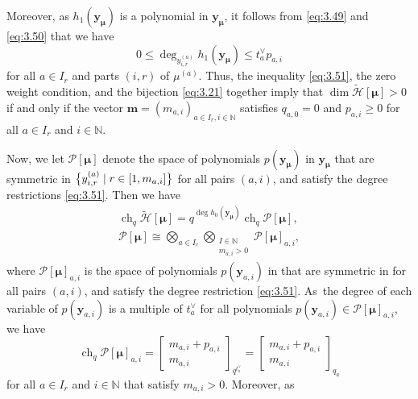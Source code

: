 \documentclass[pdftex]{sigma}
\numberwithin{equation}{section}
\DeclareMathOperator{\ch}{ch}
\begin{document}
Moreover, as $h_1(\mathbf{y}_{\bm{\mu}})$ is a polynomial in $\mathbf{y}_{ \bm{\mu}}$, it follows from \eqref{eq:3.49} and \eqref{eq:3.50} that we have
\begin{equation}\label{eq:3.51}
0\leq \deg_{y_{i,r}^{(a)}}h_1(\mathbf{y}_{\bm{\mu}})
\leq t_a^{\vee}p_{a,i}
\end{equation}
for all $a\in I_r$ and parts $(i,r)$ of $\mu^{(a)}$. Thus, the inequality \eqref{eq:3.51}, the zero weight condition, and the bijection \eqref{eq:3.21} together imply that $\dim\tilde{\mathcal{H}}[\bm{\mu}]>0$ if and only if the vector $\mathbf{m}=(m_{a,i})_{a\in I_r,i\in \mathbb{N}}$ satisfies $q_{a,0}=0$ and
$p_{a,i}\geq0$ for all $a\in I_r$ and $i\in\mathbb{N}$.

Now, we let $\mathcal{P}[\bm{\mu}]$ denote the space of polynomials $p(\mathbf{y}_{\bm{\mu}})$ in $\mathbf{y}_{\bm{\mu}}$ that are symmetric in $\bigl\{\smash{y_{i,r}^{(a)}}\mid r\in[1,m_{a,i}]\bigr\}$ for all pairs $(a,i)$, and satisfy the degree restrictions \eqref{eq:3.51}. Then we have
\begin{gather}
\ch_q\tilde{\mathcal{H}}[\bm{\mu}]
=q^{\deg h_0(\mathbf{y}_{\bm{\mu}})}\ch_q\mathcal{P}[\bm{\mu}],\label{eq:3.52}\\
\mathcal{P}[\bm{\mu}]
\cong\bigotimes_{a\in I_r}\bigotimes_{\substack{I\in\mathbb{N}\\m_{a,i}>0}}\mathcal{P}[\bm{\mu}]_{a,i},\label{eq:3.53}
\end{gather}
where $\mathcal{P}[\bm{\mu}]_{a,i}$ is the space of polynomials $p(\mathbf{y}_{a,i})$ in  that are symmetric in  for all pairs $(a,i)$, and satisfy the degree restriction \eqref{eq:3.51}. As~the degree of each variable  of $p(\mathbf{y}_{a,i})$ is a multiple of $t_a^{\vee}$ for all polynomials $p(\mathbf{y}_{a,i})\in\mathcal{P}[\bm{\mu}]_{a,i}$, we have
\begin{equation*}
\ch_q\mathcal{P}[\bm{\mu}]_{a,i}=\begin{bmatrix} m_{a,i}+p_{a,i} \\m_{a,i}\end{bmatrix}_{q^{t_a^{\vee}}}=\begin{bmatrix} m_{a,i}+p_{a,i}\\m_{a,i}\end{bmatrix}_{q_a}
\end{equation*}
for all $a\in I_r$ and $i\in\mathbb{N}$ that satisfy $m_{a,i}>0$. Moreover, as
\end{document}
